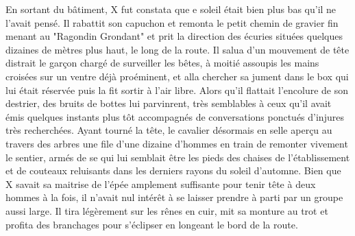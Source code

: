 \documentclass{book}
\begin{document}
En sortant du bâtiment, X fut constata que e soleil était bien plus bas qu'il ne l'avait pensé. Il rabattit son capuchon et remonta le petit chemin de gravier fin menant au "Ragondin Grondant" et prit la direction des écuries situées quelques dizaines de mètres plus haut, le long de la route. Il salua d'un mouvement de tête distrait le garçon chargé de surveiller les bêtes, à moitié assoupis les mains croisées sur un ventre déjà proéminent, et alla chercher sa jument dans le box qui lui était réservée puis la fit sortir à l'air libre. Alors qu'il flattait l'encolure de son destrier, des bruits de bottes lui parvinrent, très semblables à ceux qu'il avait émis quelques instants plus tôt accompagnés de conversations ponctués d'injures très recherchées. Ayant tourné la tête, le cavalier désormais en selle aperçu au travers des arbres une file d'une dizaine d'hommes en train de remonter vivement le sentier, armés de se qui lui semblait être les pieds des chaises de l'établissement et de couteaux reluisants dans les derniers rayons du soleil d'automne. Bien que X savait sa maitrise de l'épée amplement suffisante pour tenir tête à deux hommes à la fois, il n'avait nul intérêt à se laisser prendre à parti par un groupe aussi large.
Il tira légèrement sur les rênes en cuir, mit sa monture au trot et profita des branchages pour s'éclipser en longeant le bord de la route. \newline
\end{document}
